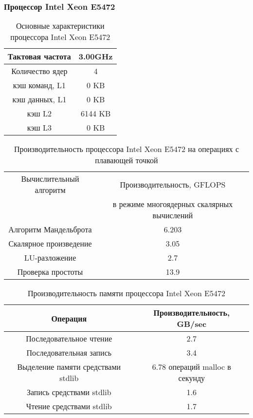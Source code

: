 \subsubsection{Процессор Intel Xeon E5472}
\begin{table}[ht]
	\begin{center}
		\caption{Основные характеристики процессора Intel Xeon  E5472}
		\begin{tabular}{|c|c|}
			\hline	
			Тактовая частота & 3.00GHz   \\ \hline
			Количество ядер & 4 	     \\ \hline
			кэш команд, L1 &  0 KB      \\ \hline
			кэш данных, L1 &  0 KB       \\ \hline
			кэш L2         &  6144 KB      \\ \hline
			кэш L3         &  0 KB        \\ \hline
		\end{tabular}
	\end{center} 	
\end{table} 	

\begin{table}[ht]
	\begin{center}
		\caption{Производительность процессора Intel Xeon  E5472 на операциях с плавающей точкой}
		\begin{tabular}{|c|c|}
			\hline	
			Вычислительный алгоритм &  Производительность, GFLOPS \\ 
			& в режиме многоядерных скалярных вычислений \\ \hline
			Алгоритм Мандельброта  &  6.203 	\\ \hline
			Скалярное произведение &  3.05   \\ \hline
			LU-разложение          &  2.7   \\ \hline
			Проверка простоты      &  13.9  \\ \hline 
			
			
		\end{tabular}
	\end{center} 	
\end{table} 	

\begin{table}[ht]
	\begin{center}
		\caption{Производительность памяти процессора Intel Xeon E5472}
		\begin{tabular}{|c|c|}
			\hline	
			Операция  &  Производительность, GB/sec \\ \hline
			Последовательное чтение &  2.7 	\\  \hline
			Последовательная запись &  3.4   \\  \hline
			Выделение памяти средствами stdlib &  6.78 операций malloc в секунду  \\  \hline
			Запись средствами stdlib  & 1.6  \\ \hline
			Чтение средствами stdlib  & 1.7  \\ \hline 
		\end{tabular}
	\end{center} 	
\end{table} 	



